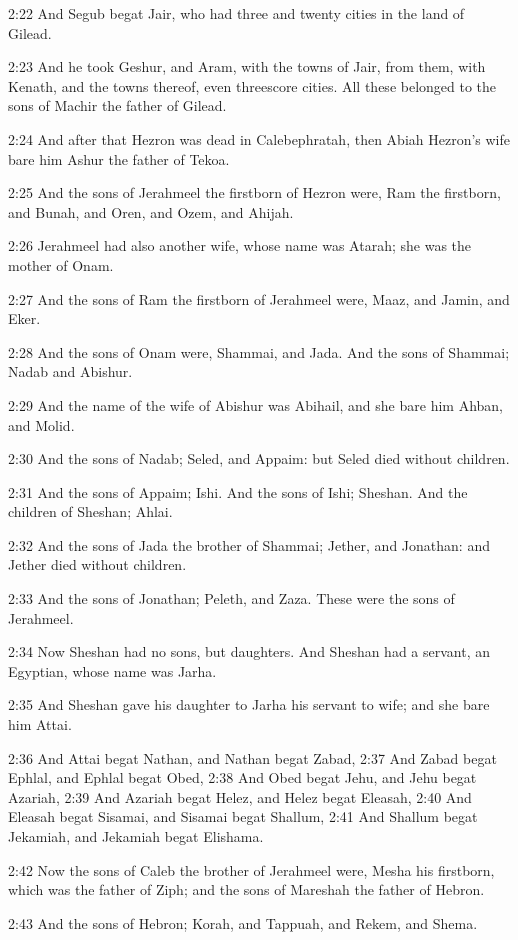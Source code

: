 2:22 And Segub begat Jair, who had three and twenty cities in the land of Gilead.

2:23 And he took Geshur, and Aram, with the towns of Jair, from them, with Kenath, and the towns thereof, even threescore cities. All these belonged to the sons of Machir the father of Gilead.

2:24 And after that Hezron was dead in Calebephratah, then Abiah Hezron's wife bare him Ashur the father of Tekoa.

2:25 And the sons of Jerahmeel the firstborn of Hezron were, Ram the firstborn, and Bunah, and Oren, and Ozem, and Ahijah.

2:26 Jerahmeel had also another wife, whose name was Atarah; she was the mother of Onam.

2:27 And the sons of Ram the firstborn of Jerahmeel were, Maaz, and Jamin, and Eker.

2:28 And the sons of Onam were, Shammai, and Jada. And the sons of Shammai; Nadab and Abishur.

2:29 And the name of the wife of Abishur was Abihail, and she bare him Ahban, and Molid.

2:30 And the sons of Nadab; Seled, and Appaim: but Seled died without children.

2:31 And the sons of Appaim; Ishi. And the sons of Ishi; Sheshan. And the children of Sheshan; Ahlai.

2:32 And the sons of Jada the brother of Shammai; Jether, and Jonathan: and Jether died without children.

2:33 And the sons of Jonathan; Peleth, and Zaza. These were the sons of Jerahmeel.

2:34 Now Sheshan had no sons, but daughters. And Sheshan had a servant, an Egyptian, whose name was Jarha.

2:35 And Sheshan gave his daughter to Jarha his servant to wife; and she bare him Attai.

2:36 And Attai begat Nathan, and Nathan begat Zabad, 2:37 And Zabad begat Ephlal, and Ephlal begat Obed, 2:38 And Obed begat Jehu, and Jehu begat Azariah, 2:39 And Azariah begat Helez, and Helez begat Eleasah, 2:40 And Eleasah begat Sisamai, and Sisamai begat Shallum, 2:41 And Shallum begat Jekamiah, and Jekamiah begat Elishama.

2:42 Now the sons of Caleb the brother of Jerahmeel were, Mesha his firstborn, which was the father of Ziph; and the sons of Mareshah the father of Hebron.

2:43 And the sons of Hebron; Korah, and Tappuah, and Rekem, and Shema.

